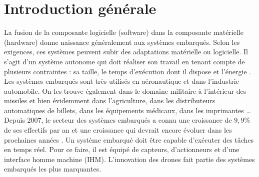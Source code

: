 \chapter*{Introduction générale}
La fusion de la composante logicielle (software) dans la composante matérielle (hardware) donne naissance généralement aux systèmes embarqués.
Selon les exigences, ces systèmes peuvent subir des adaptations matérielle ou logicielle. Il s'agit d'un système autonome qui doit réaliser son travail en tenant compte de plusieurs contraintes : sa taille, le temps d'exécution dont il dispose et l'énergie \cite{FUTURA}. Les systèmes embarqués sont très utilisés en aéronautique et dans l'industrie automobile. On les trouve également dans le domaine militaire à l'intérieur des missiles et bien évidemment dans l'agriculture, dans les distributeurs automatiques de billets, dans les équipements médicaux, dans les imprimantes \ldots
Depuis 2007, le secteur des systèmes embarqués a connu une croissance de $9,9\%$ de ses effectifs par an  et une croissance qui devrait encore évoluer dans les prochaines années \cite{PierreAudoin}. 
Un système embarqué doit être capable d'exécuter des tâches en temps réel. 
Pour ce faire, il est équipé de capteurs, d'actionneurs et d'une interface homme machine (IHM). 
L'innovation des drones fait partie des systèmes embarqués les plus marquantes. 


